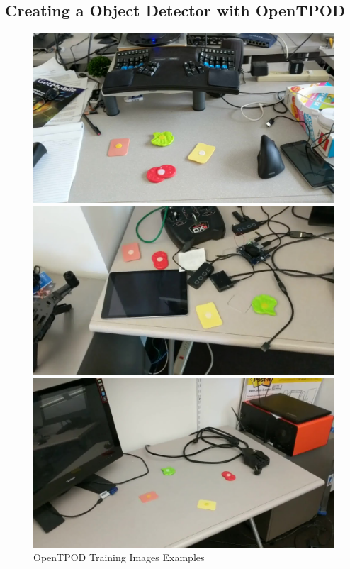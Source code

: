 \subsection{Creating a Object Detector with OpenTPOD}

\begin{figure}[]
  \centering
  \begin{minipage}[b]{0.32\textwidth}
    \includegraphics[width=\textwidth]{FIGS/sandwich-training-1.jpg}
  \end{minipage}
  \begin{minipage}[b]{0.32\textwidth}
    \includegraphics[width=\textwidth]{FIGS/sandwich-training-2.jpg}
  \end{minipage}
  \begin{minipage}[b]{0.32\textwidth}
    \includegraphics[width=\textwidth]{FIGS/sandwich-training-3.jpg}
  \end{minipage}
  \caption{OpenTPOD Training Images Examples}
  \label{figs:tpod-example-training-images}
\end{figure}

